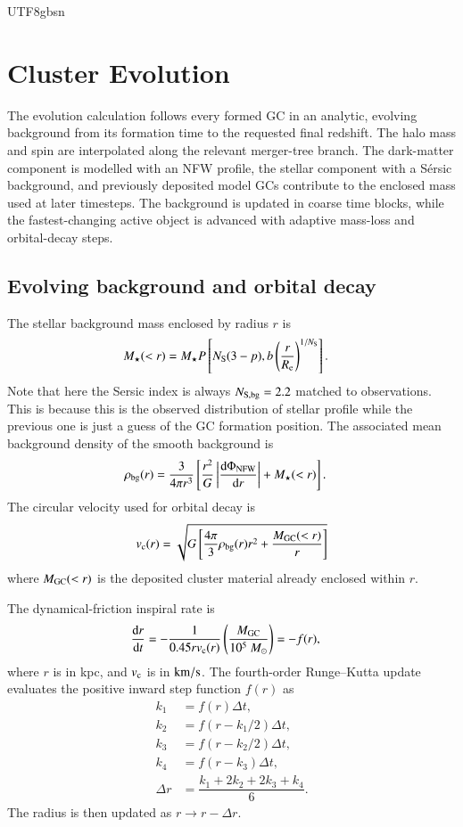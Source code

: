 \documentclass[trackchanges, twocolappendix, twocolumn]{aastex701}
\begin{document}
\begin{CJK*}{UTF8}{gbsn}
\section{Cluster Evolution} \label{appx:GCevo}

The evolution calculation follows every formed GC in an analytic, evolving background from its formation time to the requested final redshift. The halo mass and spin are interpolated along the relevant merger-tree branch. The dark-matter component is modelled with an NFW profile, the stellar component with a S{\'e}rsic background, and previously deposited model GCs contribute to the enclosed mass used at later timesteps. The background is updated in coarse time blocks, while the fastest-changing active object is advanced with adaptive mass-loss and orbital-decay steps.

\subsection{Evolving background and orbital decay}

The stellar background mass enclosed by radius $r$ is
\begin{align}
M_{\star}(<r) & = M_{\star} P \left[ N_{\rm S} (3 - p), b \left( \dfrac{r}{R_{\rm e}} \right)^{1 / N_{\rm S}} \right].
\end{align}
Note that here the Sersic index is always $N_{\rm S, bg} = 2.2$ matched to observations. This is because this is the observed distribution of stellar profile while the previous one is just a guess of the GC formation position. The associated mean background density of the smooth background is
\begin{align}
\rho_{\rm bg} (r) & = \dfrac{3}{4 \pi r^3} \left[ \dfrac{r^2}{G} \left| \dfrac{{\rm d}  \Phi_{\rm NFW}}{{\rm d}  r} \right| + M_\star (< r) \right] .
\label{eq:rho_bg}
\end{align}
The circular velocity used for orbital decay is
\begin{align}
v_{\rm c} (r) = \sqrt{G \left[ \dfrac{4 \pi}{3} \rho_{\rm bg} (r) r^2 + \dfrac{M_{\rm GC} (< r)}{r} \right]}
\label{eq:v_c}
\end{align}
where $M_{\rm GC} (< r)$ is the deposited cluster material already enclosed within $r$.

The dynamical-friction inspiral rate is
\begin{align}
\dfrac{{\rm d}  r}{{\rm d}  t} & = - \dfrac{1}{0.45 r v_{\rm c} (r)} \left( \dfrac{M_{\rm GC}}{10^5~M_\odot} \right) = - f (r),
\label{eq:DF}
\end{align}
where $r$ is in kpc, and $v_{\rm c}$ is in $\rm km/s$. The fourth-order Runge--Kutta update evaluates the positive inward step function $f (r)$ as
\begin{align}
k_1 & = f (r) \Delta t , \\
k_2 & = f (r - k_1 / 2) \Delta t , \\
k_3 & = f (r - k_2 / 2) \Delta t , \\
k_4 & = f (r - k_3) \Delta t , \\
\Delta r &= \dfrac{k_1+2k_2+2k_3+k_4}{6}.
\end{align}
The radius is then updated as $r\rightarrow r-\Delta r$.


\end{CJK*}
\end{document}

